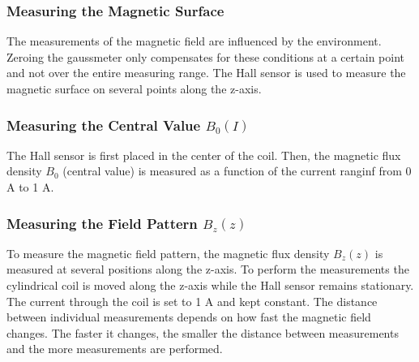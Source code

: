 \subsubsection{Measuring the Magnetic Surface}
\label{subsubsec:Measuring_the_Magnetic_Surface}
The measurements of the magnetic field are influenced by the environment. Zeroing the gaussmeter only compensates for these conditions at a certain point and not over the entire measuring range. The Hall sensor is used to measure the magnetic surface on several points along the z-axis.

\subsubsection{Measuring the Central Value $B_0(I)$}
\label{subsubsec:Measuring_the_Central_Value}
The Hall sensor is first placed in the center of the coil. Then, the magnetic flux density $B_0$ (central value) is measured as a function of the current ranginf from 0 A to 1 A.

\subsubsection{Measuring the Field Pattern $B_z(z)$}
\label{subsubsec:Measuring_the_Field_Pattern}
To measure the magnetic field pattern, the magnetic flux density $B_z(z)$ is measured at several positions along the z-axis. To perform the measurements the cylindrical coil is moved along the z-axis while the Hall sensor remains stationary. The current through the coil is set to 1 A and kept constant. The distance between individual measurements depends on how fast the magnetic field changes. The faster it changes, the smaller the distance between measurements and the more measurements are performed.
